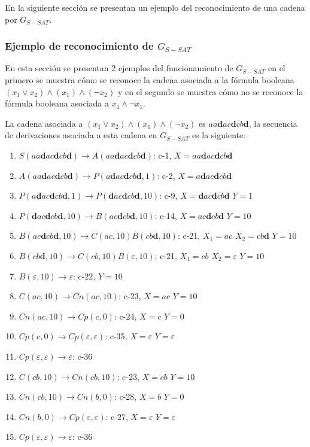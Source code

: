 \documentclass[12pt]{article}
\begin{document}
En la siguiente sección se presentan un ejemplo del reconocimiento de una cadena por $G_{S-SAT}$.

\subsubsection{Ejemplo de reconocimiento de $G_{S-SAT}$}

En esta sección se presentan 2 ejemplos del funcionamiento de $G_{S-SAT}$ en el primero se muestra cómo se
reconoce la cadena asociada a la fórmula booleana $(x_1 \vee x_2) \wedge (x_1) \wedge (\neg x_2)$ y en el
segundo se muestra cómo no se reconoce la fórmula booleana asociada a $x_1 \wedge \neg x_1$.

La cadena asociada a $(x_1 \vee x_2) \wedge (x_1) \wedge (\neg x_2)$ es $aa\mathbf{d}ac\mathbf{d}cb\mathbf{d}$, la secuencia de derivaciones
asociada a esta cadena en $G_{S-SAT}$ es la siguiente:

\begin{enumerate}
    \item $S(aa\mathbf{d}ac\mathbf{d}cb\mathbf{d})\to A(aa\mathbf{d}ac\mathbf{d}cb\mathbf{d})$: c-1, $X=aa\mathbf{d}ac\mathbf{d}cb\mathbf{d}$
    \item $A(aa\mathbf{d}ac\mathbf{d}cb\mathbf{d})\to P(a\mathbf{d}ac\mathbf{d}cb\mathbf{d},1)$: c-2, $X=a\mathbf{d}ac\mathbf{d}cb\mathbf{d}$
    \item $P(a\mathbf{d}ac\mathbf{d}cb\mathbf{d},1)\to P(\mathbf{d}ac\mathbf{d}cb\mathbf{d},10)$: c-9, $X=\mathbf{d}ac\mathbf{d}cb\mathbf{d}$ $Y=1$
    \item $P(\mathbf{d}ac\mathbf{d}cb\mathbf{d},10)\to B(ac\mathbf{d}cb\mathbf{d}, 10)$: c-14, $X=ac\mathbf{d}cb\mathbf{d}$ $Y=10$
    \item $B(ac\mathbf{d}cb\mathbf{d}, 10)\to C(ac,10) B(cb\mathbf{d},10)$: c-21, $X_1=ac$ $X_2=cb\mathbf{d}$ $Y=10$
    \item $B(cb\mathbf{d},10)\to C(cb,10) B(\varepsilon,10)$: c-21, $X_1=cb$ $X_2=\varepsilon$ $Y=10$
    \item $B(\varepsilon,10)\to \varepsilon$: c-22, $Y=10$
    \item $C(ac,10)\to Cn(ac,10)$: c-23, $X=ac$ $Y=10$
    \item $Cn(ac,10)\to Cp(c,0)$: c-24, $X=c$ $Y=0$
    \item $Cp(c,0)\to Cp(\varepsilon,\varepsilon)$: c-35, $X=\varepsilon$ $Y=\varepsilon$
    \item $Cp(\varepsilon, \varepsilon) \to \varepsilon$: c-36
    \item $C(cb,10)\to Cn(cb,10)$: c-23, $X=cb$ $Y=10$
    \item $Cn(cb,10)\to Cn(b,0)$: c-28, $X=b$ $Y=0$
    \item $Cn(b,0)\to Cp(\varepsilon,\varepsilon)$: c-27, $X=\varepsilon$ $Y=\varepsilon$
    \item $Cp(\varepsilon, \varepsilon) \to \varepsilon$: c-36
\end{enumerate}
\end{document}
